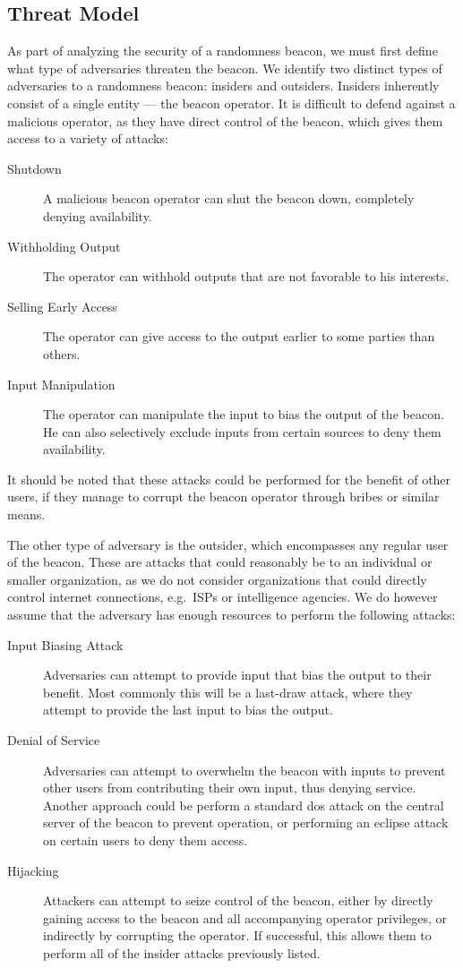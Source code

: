 \subsection{Threat Model}
As part of analyzing the security of a randomness beacon, we must first define what type of adversaries threaten the beacon. We identify two distinct types of adversaries to a randomness beacon: insiders and outsiders. Insiders inherently consist of a single entity --- the beacon operator. It is difficult to defend against a malicious operator, as they have direct control of the beacon, which gives them access to a variety of attacks:

\begin{description}
    \item [Shutdown] A malicious beacon operator can shut the beacon down, completely denying availability.
    \item [Withholding Output] The operator can withhold outputs that are not favorable to his interests.
    \item [Selling Early Access] The operator can give access to the output earlier to some parties than others.
    \item [Input Manipulation] The operator can manipulate the input to bias the output of the beacon. He can also selectively exclude inputs from certain sources to deny them availability.

\end{description}

It should be noted that these attacks could be performed for the benefit of other users, if they manage to corrupt the beacon operator through bribes or similar means.

The other type of adversary is the outsider, which encompasses any regular user of the beacon. These are attacks that could reasonably be to an individual or smaller organization, as we do not consider organizations that could directly control internet connections, e.g.\ ISPs or intelligence agencies. We do however assume that the adversary has enough resources to perform the following attacks:

\begin{description}
    \item [Input Biasing Attack] Adversaries can attempt to provide input that bias the output to their benefit. Most commonly this will be a last-draw attack, where they attempt to provide the last input to bias the output.
    \item [Denial of Service] Adversaries can attempt to overwhelm the beacon with inputs to prevent other users from contributing their own input, thus denying service. Another approach could be perform a standard \gls{dos} attack on the central server of the beacon to prevent operation, or performing an eclipse attack on certain users to deny them access.
    \item [Hijacking] Attackers can attempt to seize control of the beacon, either by directly gaining access to the beacon and all accompanying operator privileges, or indirectly by corrupting the operator. If successful, this allows them to perform all of the insider attacks previously listed.
\end{description}



